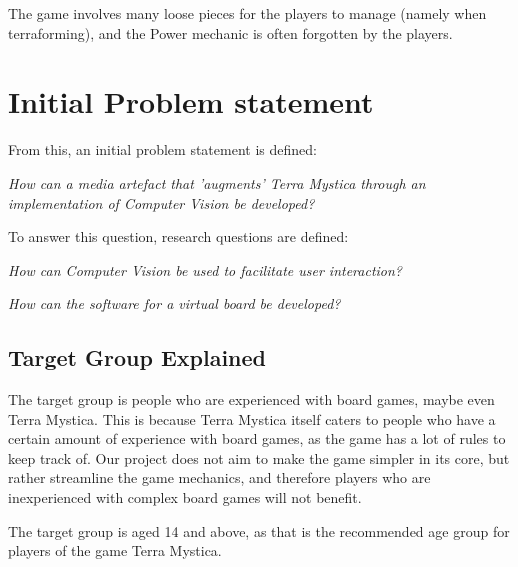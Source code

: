 The game involves many loose pieces for the players to manage (namely when terraforming), and the Power mechanic is often forgotten by the players.

\section{Initial Problem statement}
From this, an initial problem statement is defined: 

\textit{How can a media artefact that 'augments' Terra Mystica through an implementation of Computer Vision be developed?}

To answer this question, research questions are defined:

\textit{How can Computer Vision be used to facilitate user interaction?}

\textit{How can the software for a virtual board be developed?}

\subsection{Target Group Explained}
The target group is people who are experienced with board games, maybe even Terra Mystica. This is because Terra Mystica itself caters to people who have a certain amount of experience with board games, as the game has a lot of rules to keep track of. Our project does not aim to make the game simpler in its core, but rather streamline the game mechanics, and therefore players who are inexperienced with complex board games will not benefit.

The target group is aged 14 and above, as that is the recommended age group for players of the game Terra Mystica.